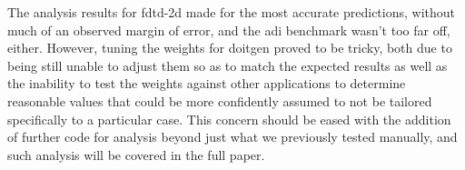 The analysis results for fdtd-2d made for the most accurate predictions, without much of an observed margin of error, and the adi benchmark wasn't too far off, either.
However, tuning the weights for doitgen proved to be tricky, both due to being still unable to adjust them so as to match the expected results as well as the inability to test the weights against other applications to determine reasonable values that could be more confidently assumed to not be tailored specifically to a particular case.
This concern should be eased with the addition of further code for analysis beyond just what we previously tested manually, and such analysis will be covered in the full paper.

